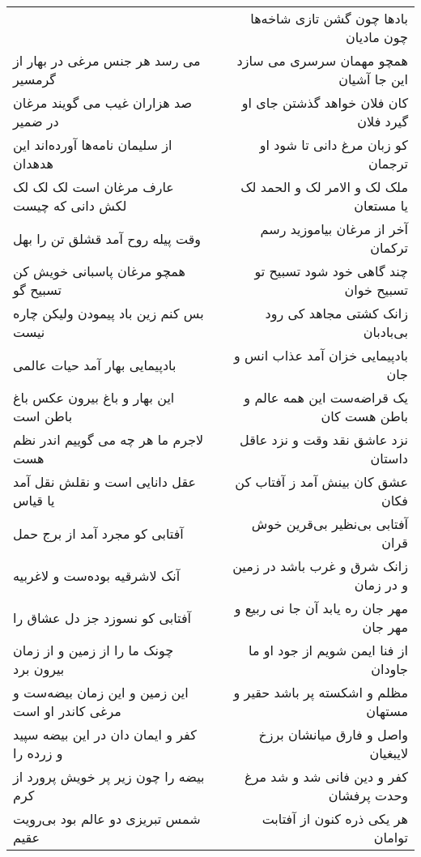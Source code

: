 \begin{center}
\begin{longtable}{l p{0.5cm} r}
&&
بادها چون گشن تازی شاخه‌ها چون مادیان
\\
می رسد هر جنس مرغی در بهار از گرمسیر
&&
همچو مهمان سرسری می سازد این جا آشیان
\\
صد هزاران غیب می گویند مرغان در ضمیر
&&
کان فلان خواهد گذشتن جای او گیرد فلان
\\
از سلیمان نامه‌ها آورده‌اند این هدهدان
&&
کو زبان مرغ دانی تا شود او ترجمان
\\
عارف مرغان است لک لک لک لکش دانی که چیست
&&
ملک لک و الامر لک و الحمد لک یا مستعان
\\
وقت پیله روح آمد قشلق تن را بهل
&&
آخر از مرغان بیاموزید رسم ترکمان
\\
همچو مرغان پاسبانی خویش کن تسبیح گو
&&
چند گاهی خود شود تسبیح تو تسبیح خوان
\\
بس کنم زین باد پیمودن ولیکن چاره نیست
&&
زانک کشتی مجاهد کی رود بی‌بادبان
\\
بادپیمایی بهار آمد حیات عالمی
&&
بادپیمایی خزان آمد عذاب انس و جان
\\
این بهار و باغ بیرون عکس باغ باطن است
&&
یک قراضه‌ست این همه عالم و باطن هست کان
\\
لاجرم ما هر چه می گوییم اندر نظم هست
&&
نزد عاشق نقد وقت و نزد عاقل داستان
\\
عقل دانایی است و نقلش نقل آمد یا قیاس
&&
عشق کان بینش آمد ز آفتاب کن فکان
\\
آفتابی کو مجرد آمد از برج حمل
&&
آفتابی بی‌نظیر بی‌قرین خوش قران
\\
آنک لاشرقیه بوده‌ست و لاغربیه
&&
زانک شرق و غرب باشد در زمین و در زمان
\\
آفتابی کو نسوزد جز دل عشاق را
&&
مهر جان ره یابد آن جا نی ربیع و مهر جان
\\
چونک ما را از زمین و از زمان بیرون برد
&&
از فنا ایمن شویم از جود او ما جاودان
\\
این زمین و این زمان بیضه‌ست و مرغی کاندر او است
&&
مظلم و اشکسته پر باشد حقیر و مستهان
\\
کفر و ایمان دان در این بیضه سپید و زرده را
&&
واصل و فارق میانشان برزخ لایبغیان
\\
بیضه را چون زیر پر خویش پرورد از کرم
&&
کفر و دین فانی شد و شد مرغ وحدت پرفشان
\\
شمس تبریزی دو عالم بود بی‌رویت عقیم
&&
هر یکی ذره کنون از آفتابت توامان
\\
\end{longtable}
\end{center}
